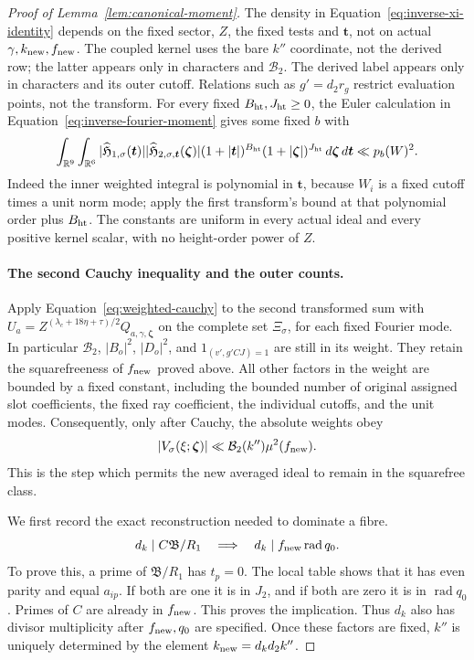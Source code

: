 \documentclass[11pt,a4paper]{article}
\numberwithin{equation}{section}
\numberwithin{figure}{section}
\theoremstyle{definition}
\theoremstyle{remark}
\begin{document}
\begin{proof}[Proof of Lemma~\ref{lem:canonical-moment}]
The density in Equation~\eqref{eq:inverse-xi-identity} depends on the
fixed sector, \(Z\), the fixed tests and \(\boldsymbol t\), not on
actual \(\gamma,k_{\rm new},f_{\rm new}\).  The coupled kernel uses
the bare \(k''\) coordinate, not the derived row; the latter appears
only in characters and \(\mathcal B_2\).  The derived label appears
only in characters and its outer cutoff.  Relations such as
\(g'=d_2r_g\) restrict evaluation points, not the transform.
For every fixed \(B_{\rm ht},J_{\rm ht}\ge0\), the Euler calculation
in Equation~\eqref{eq:inverse-fourier-moment} gives some fixed \(b\) with
\begin{equation}\label{eq:inverse-joint-fourier-moments}
 \int_{\mathbb R^9}\int_{\mathbb R^6}
 |\widehat{\mathfrak H}_{1,\sigma}(\boldsymbol t)|
 |\widehat{\mathfrak H}_{2,\sigma,\boldsymbol t}(\boldsymbol\zeta)|
 (1+|\boldsymbol t|)^{B_{\rm ht}}(1+|\boldsymbol\zeta|)^{J_{\rm ht}}
 \,d\boldsymbol\zeta\,d\boldsymbol t\ll p_b(W)^2.
\end{equation}
Indeed the inner weighted integral is polynomial in \(\boldsymbol t\),
because \(W_i\) is a fixed cutoff times a unit norm mode; apply the
first transform's bound at that polynomial order plus \(B_{\rm ht}\).
The constants are uniform in every actual ideal and every positive
kernel scalar, with no height-order power of \(Z\).

\paragraph{The second Cauchy inequality and the outer counts.}
Apply Equation~\eqref{eq:weighted-cauchy} to the second transformed
sum with
\(U_a=Z^{(\lambda_c+18\eta+\tau)/2}Q_{a,\gamma,\boldsymbol\zeta}\)
on the complete set \(\Xi_\sigma\), for each fixed Fourier mode.
In particular \(\mathcal B_2\), \(|B_o|^2\), \(|D_o|^2\), and
\(1_{(v',g'CJ)=1}\) are still in its weight. They retain the
squarefreeness of \(f_{\rm new}\) proved above. All other factors in
the weight are bounded by a fixed constant,
including the bounded number of original assigned slot coefficients,
the fixed ray coefficient, the individual cutoffs, and the unit modes.
Consequently, only after Cauchy, the absolute weights obey
\[
 |V_\sigma(\xi;\boldsymbol\zeta)|
 \ll \mathcal B_2(k'')\mu^2(f_{\rm new}).
\]
This is the step which permits the new averaged ideal to remain in
the squarefree class.

We first record the exact reconstruction needed to dominate a fibre.
\begin{equation}\label{eq:poisson-divisor-reconstruction}
 d_k\mid C\mathfrak B/R_1
 \quad\Longrightarrow\quad
 d_k\mid f_{\rm new}\operatorname{rad}q_0.
\end{equation}
To prove this, a prime of \(\mathfrak B/R_1\) has \(t_p=0\).
The local table shows that it has even parity and equal \(a_{ip}\).
If both are one it is in \(J_2\), and if both are zero it is in
\(\operatorname{rad}q_0\).  Primes of \(C\) are already in
\(f_{\rm new}\).  This proves the implication.  Thus \(d_k\) also
has divisor multiplicity after \(f_{\rm new},q_0\) are specified.
Once these factors are fixed, \(k''\) is uniquely determined by
the element \(k_{\rm new}=d_kd_2k''\).


\end{proof}
\end{document}
